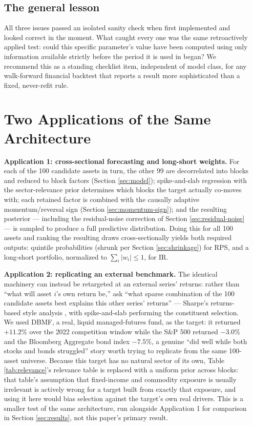 \documentclass[11pt]{article}
\begin{document}
\subsection{The general lesson}
All three issues passed an isolated sanity check when first implemented
and looked correct in the moment. What caught every one was the same
retroactively applied test: could this specific parameter's value have
been computed using only information available strictly before the
period it is used in began? We recommend this as a standing checklist
item, independent of model class, for any walk-forward financial
backtest that reports a result more sophisticated than a fixed,
never-refit rule.

\section{Two Applications of the Same Architecture}
\label{sec:applications}

\textbf{Application 1: cross-sectional forecasting and long-short
weights.} For each of the 100 candidate assets in turn, the other 99 are
decorrelated into blocks and reduced to block factors (Section
\ref{sec:model}); spike-and-slab regression with the sector-relevance
prior determines which blocks the target actually co-moves with; each
retained factor is combined with the causally adaptive momentum/reversal
sign (Section \ref{sec:momentum-sign}); and the resulting posterior
--- including the residual-noise correction of Section
\ref{sec:residual-noise} --- is sampled to produce a full predictive
distribution. Doing this for all 100 assets and ranking the resulting
draws cross-sectionally yields both required outputs: quintile
probabilities (shrunk per Section \ref{sec:shrinkage}) for RPS, and a
long-short portfolio, normalized to $\sum_i|w_i|\le 1$, for IR.

\textbf{Application 2: replicating an external benchmark.} The identical
machinery can instead be retargeted at an external series' returns:
rather than ``what will asset $i$'s own return be,'' ask ``what sparse
combination of the 100 candidate assets best explains this other
series' returns'' --- Sharpe's returns-based style analysis
\citep{sharpe1992}, with spike-and-slab performing the constituent
selection. We used DBMF, a real, liquid managed-futures fund, as the
target: it returned $+11.2\%$ over the 2022 competition window while the
S\&P 500 returned $-3.0\%$ and the Bloomberg Aggregate bond index
$-7.5\%$, a genuine ``did well while both stocks and bonds struggled''
story worth trying to replicate from the same 100-asset universe. Because
this target has no natural sector of its own, Table \ref{tab:relevance}'s
relevance table is replaced with a uniform prior across blocks: that
table's assumption that fixed-income and commodity exposure is usually
irrelevant is actively wrong for a target built from exactly that
exposure, and using it here would bias selection against the target's
own real drivers. This is a smaller test of the same architecture, run
alongside Application 1 for comparison in Section \ref{sec:results}, not
this paper's primary result.
\end{document}
